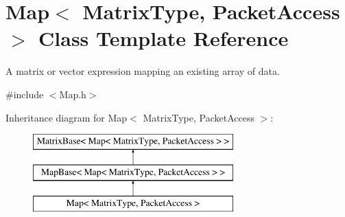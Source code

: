 \hypertarget{class_map}{\section{Map$<$ Matrix\-Type, Packet\-Access $>$ Class Template Reference}
\label{class_map}
}


A matrix or vector expression mapping an existing array of data.  




{\ttfamily \#include $<$Map.\-h$>$}

Inheritance diagram for Map$<$ Matrix\-Type, Packet\-Access $>$\-:\begin{figure}[H]
\begin{center}
\leavevmode
\includegraphics[height=3.000000cm]{class_map}
\end{center}
\end{figure}
